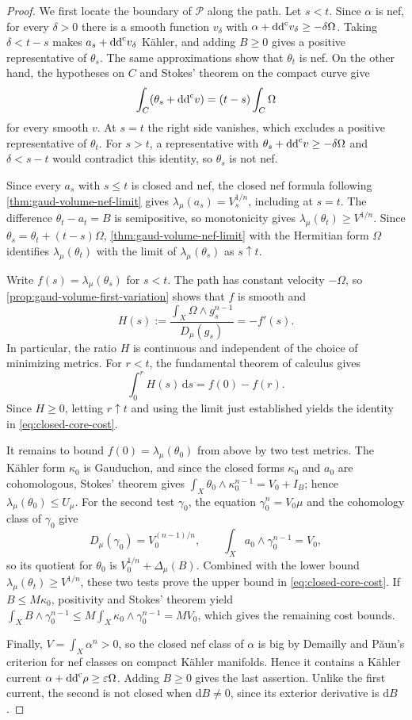 \begin{proof}
We first locate the boundary of $\mathscr P$ along the path. Let $s<t$. Since $\alpha$ is nef, for every $\delta>0$ there is a smooth function $v_\delta$ with $\alpha+\mathrm{dd}^{\mathrm{c}} v_\delta\geq-\delta\Omega$. Taking $\delta<t-s$ makes $a_s+\mathrm{dd}^{\mathrm{c}} v_\delta$ K\"ahler, and adding $B\geq0$ gives a positive representative of $\theta_s$. The same approximations show that $\theta_t$ is nef. On the other hand, the hypotheses on $C$ and Stokes' theorem on the compact curve give
\[
 \int_C(\theta_s+\mathrm{dd}^{\mathrm{c}} v)=(t-s)\int_C\Omega
\]
for every smooth $v$. At $s=t$ the right side vanishes, which excludes a positive representative of $\theta_t$. For $s>t$, a representative with $\theta_s+\mathrm{dd}^{\mathrm{c}} v\geq-\delta\Omega$ and $\delta<s-t$ would contradict this identity, so $\theta_s$ is not nef.

Since every $a_s$ with $s\leq t$ is closed and nef, the closed nef formula following \cref{thm:gaud-volume-nef-limit} gives $\lambda_\mu(a_s)=V_s^{1/n}$, including at $s=t$. The difference $\theta_t-a_t=B$ is semipositive, so monotonicity gives $\lambda_\mu(\theta_t)\geq V^{1/n}$. Since $\theta_s=\theta_t+(t-s)\Omega$, \cref{thm:gaud-volume-nef-limit} with the Hermitian form $\Omega$ identifies $\lambda_\mu(\theta_t)$ with the limit of $\lambda_\mu(\theta_s)$ as $s\uparrow t$.

Write $f(s)=\lambda_\mu(\theta_s)$ for $s<t$. The path has constant velocity $-\Omega$, so \cref{prop:gaud-volume-first-variation} shows that $f$ is smooth and
\[
 H(s):=\frac{\int_X\Omega\wedge g_s^{n-1}}{D_\mu(g_s)}=-f'(s).
\]
In particular, the ratio $H$ is continuous and independent of the choice of minimizing metrics. For $r<t$, the fundamental theorem of calculus gives
\[
 \int_0^rH(s)\,\mathrm{d}s=f(0)-f(r).
\]
Since $H\geq0$, letting $r\uparrow t$ and using the limit just established yields the identity in \eqref{eq:closed-core-cost}.

It remains to bound $f(0)=\lambda_\mu(\theta_0)$ from above by two test metrics. The K\"ahler form $\kappa_0$ is Gauduchon, and since the closed forms $\kappa_0$ and $a_0$ are cohomologous, Stokes' theorem gives $\int_X\theta_0\wedge\kappa_0^{n-1}=V_0+I_B$; hence $\lambda_\mu(\theta_0)\leq U_\mu$. For the second test $\gamma_0$, the equation $\gamma_0^n=V_0\mu$ and the cohomology class of $\gamma_0$ give
\[
 D_\mu(\gamma_0)=V_0^{(n-1)/n},\qquad
 \int_Xa_0\wedge\gamma_0^{n-1}=V_0,
\]
so its quotient for $\theta_0$ is $V_0^{1/n}+\Delta_\mu(B)$. Combined with the lower bound $\lambda_\mu(\theta_t)\geq V^{1/n}$, these two tests prove the upper bound in \eqref{eq:closed-core-cost}. If $B\leq M\kappa_0$, positivity and Stokes' theorem yield
$\int_XB\wedge\gamma_0^{n-1}\leq M\int_X\kappa_0\wedge\gamma_0^{n-1}=MV_0$,
which gives the remaining cost bounds.

Finally, $V=\int_X\alpha^n>0$, so the closed nef class of $\alpha$ is big by Demailly and P{\u a}un's criterion for nef classes on compact K\"ahler manifolds. Hence it contains a K\"ahler current $\alpha+\mathrm{dd}^{\mathrm{c}}\rho\geq\varepsilon\Omega$. Adding $B\geq0$ gives the last assertion. Unlike the first current, the second is not closed when $\mathrm dB\neq0$, since its exterior derivative is $\mathrm{d}B$.
\end{proof}

